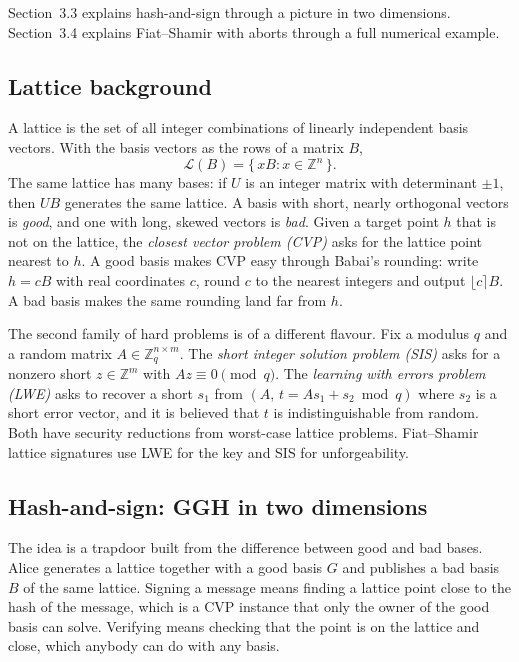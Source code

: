 \documentclass[11pt,a4paper]{article}
\theoremstyle{definition}
\newcommand{\Z}{\mathbb{Z}}
\begin{document}
Section~3.3 explains hash-and-sign through a picture in two dimensions. Section~3.4 explains Fiat--Shamir with aborts through a full numerical example.

\subsection{Lattice background}

A lattice is the set of all integer combinations of linearly independent basis vectors. With the basis vectors as the rows of a matrix $B$,
\[
\mathcal{L}(B)=\{\,xB : x\in\Z^n\,\}.
\]
The same lattice has many bases: if $U$ is an integer matrix with determinant $\pm 1$, then $UB$ generates the same lattice. A basis with short, nearly orthogonal vectors is \emph{good}, and one with long, skewed vectors is \emph{bad}. Given a target point $h$ that is not on the lattice, the \emph{closest vector problem (CVP)} asks for the lattice point nearest to $h$. A good basis makes CVP easy through Babai's rounding: write $h=cB$ with real coordinates $c$, round $c$ to the nearest integers and output $\lfloor c\rceil B$. A bad basis makes the same rounding land far from $h$.

The second family of hard problems is of a different flavour. Fix a modulus $q$ and a random matrix $A\in\Z_q^{n\times m}$. The \emph{short integer solution problem (SIS)} asks for a nonzero short $z\in\Z^m$ with $Az\equiv 0 \pmod q$. The \emph{learning with errors problem (LWE)} asks to recover a short $s_1$ from $(A,\,t=As_1+s_2 \bmod q)$ where $s_2$ is a short error vector, and it is believed that $t$ is indistinguishable from random. Both have security reductions from worst-case lattice problems. Fiat--Shamir lattice signatures use LWE for the key and SIS for unforgeability.

\subsection{Hash-and-sign: GGH in two dimensions}

The idea is a trapdoor built from the difference between good and bad bases. Alice generates a lattice together with a good basis $G$ and publishes a bad basis $B$ of the same lattice. Signing a message means finding a lattice point close to the hash of the message, which is a CVP instance that only the owner of the good basis can solve. Verifying means checking that the point is on the lattice and close, which anybody can do with any basis.
\end{document}

